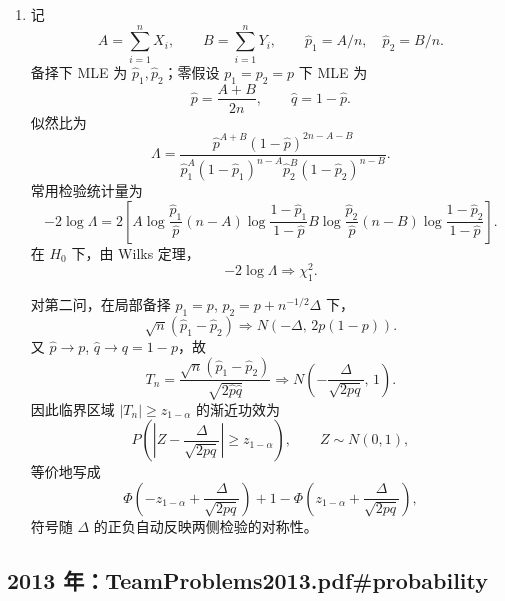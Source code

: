 \documentclass[UTF8,12pt]{ctexart}
\begin{document}
\begin{enumerate}[label=\textbf{\arabic*.},leftmargin=2.2em]
\item 记
\[
A=\sum_{i=1}^n X_i,\qquad B=\sum_{i=1}^n Y_i,\qquad
\widehat p_1=A/n,\quad \widehat p_2=B/n.
\]
备择下 MLE 为 \(\widehat p_1,\widehat p_2\)；零假设 \(p_1=p_2=p\) 下 MLE 为
\[
\widehat p=\frac{A+B}{2n},\qquad \widehat q=1-\widehat p.
\]
似然比为
\[
\Lambda
=
\frac{\widehat p^{A+B}(1-\widehat p)^{2n-A-B}}
{\widehat p_1^A(1-\widehat p_1)^{n-A}\widehat p_2^B(1-\widehat p_2)^{n-B}}.
\]
常用检验统计量为
\[
-2\log\Lambda
=2\left[
A\log\frac{\widehat p_1}{\widehat p}
(n-A)\log\frac{1-\widehat p_1}{1-\widehat p}
B\log\frac{\widehat p_2}{\widehat p}
(n-B)\log\frac{1-\widehat p_2}{1-\widehat p}
\right].
\]
在 \(H_0\) 下，由 Wilks 定理，
\[
-2\log\Lambda\Rightarrow \chi^2_1.
\]

对第二问，在局部备择 \(p_1=p\), \(p_2=p+n^{-1/2}\Delta\) 下，
\[
\sqrt n(\widehat p_1-\widehat p_2)
\Rightarrow N(-\Delta,\,2p(1-p)).
\]
又 \(\widehat p\to p\), \(\widehat q\to q=1-p\)，故
\[
T_n=\frac{\sqrt n(\widehat p_1-\widehat p_2)}{\sqrt{2\widehat p\widehat q}}
\Rightarrow N\left(-\frac{\Delta}{\sqrt{2pq}},\,1\right).
\]
因此临界区域 \(|T_n|\ge z_{1-\alpha}\) 的渐近功效为
\[
P\left(|Z-\frac{\Delta}{\sqrt{2pq}}|\ge z_{1-\alpha}\right),
\qquad Z\sim N(0,1),
\]
等价地写成
\[
\Phi\left(-z_{1-\alpha}+\frac{\Delta}{\sqrt{2pq}}\right)
+1-\Phi\left(z_{1-\alpha}+\frac{\Delta}{\sqrt{2pq}}\right),
\]
符号随 \(\Delta\) 的正负自动反映两侧检验的对称性。
\end{enumerate}


\subsection{2013 年：TeamProblems2013.pdf\#probability}
\end{document}
